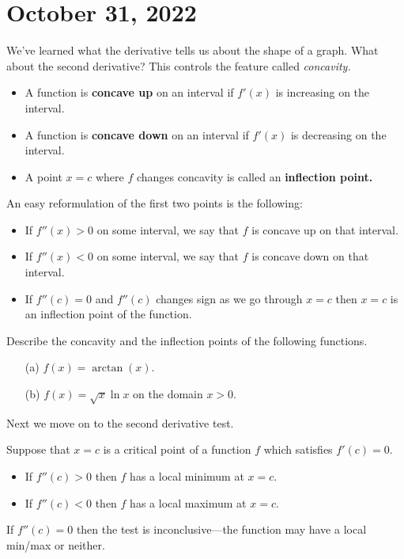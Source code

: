\documentclass[11pt]{amsart}
\begin{document}
\newpage

\section*{October 31, 2022}

We've learned what the derivative tells us about the shape of a graph. 
What about the second derivative? 
This controls the feature called {\em concavity.}

\begin{itemize} 
\item A function is {\bf concave up} on an interval if $f'(x)$ is increasing on the interval. 
\item A function is {\bf concave down} on an interval if $f'(x)$ is decreasing on the interval. 
\item A point $x = c$ where $f$ changes concavity is called an {\bf inflection point.}
\end{itemize} 

An easy reformulation of the first two points is the following:

\begin{itemize}
\item If $f''(x) > 0$ on some interval, we say that $f$ is concave up on that interval. 
\item If $f''(x) < 0$ on some interval, we say that $f$ is concave down on that interval.
\item If $f''(c) = 0$ and $f''(c)$ changes sign as we go through $x=c$ then $x=c$ is an inflection point of the function. 
\end{itemize} 

\begin{eg}
Describe the concavity and the inflection points of the following functions.
\begin{itemize}
\item[(a)] $f(x) = \arctan(x)$.
\item[(b)] $f(x) = \sqrt{x} \ln x$ on the domain $x > 0$.
\end{itemize}
\end{eg}

\newpage

Next we move on to the second derivative test. 

Suppose that $x=c$ is a critical point of a function $f$ which satisfies $f'(c) = 0$. 
\begin{itemize} 
\item If $f''(c) > 0$ then $f$ has a local minimum at $x=c$. 
\item If $f''(c) < 0$ then $f$ has a local maximum at $x=c$. 
\end{itemize}
If $f''(c) = 0$ then the test is inconclusive---the function may have a local min/max or neither. 
\end{document}
